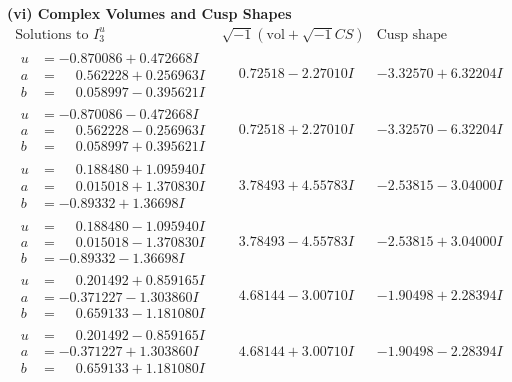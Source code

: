 \documentclass[1p]{elsarticle_modified}
\theoremstyle{definition}
\newcommand{\I}{\sqrt{-1}}
\begin{document}
\newpage\flushleft \textbf{(vi) Complex Volumes and Cusp Shapes}
$$\begin{array}{c|c|c}  
\text{Solutions to }I^u_{3}& \I (\text{vol} + \sqrt{-1}CS) & \text{Cusp shape}\\
 \hline 
\begin{aligned}
u &= -0.870086 + 0.472668 I \\
a &= \phantom{-}0.562228 + 0.256963 I \\
b &= \phantom{-}0.058997 - 0.395621 I\end{aligned}
 & \phantom{-}0.72518 - 2.27010 I & -3.32570 + 6.32204 I \\ \hline\begin{aligned}
u &= -0.870086 - 0.472668 I \\
a &= \phantom{-}0.562228 - 0.256963 I \\
b &= \phantom{-}0.058997 + 0.395621 I\end{aligned}
 & \phantom{-}0.72518 + 2.27010 I & -3.32570 - 6.32204 I \\ \hline\begin{aligned}
u &= \phantom{-}0.188480 + 1.095940 I \\
a &= \phantom{-}0.015018 + 1.370830 I \\
b &= -0.89332 + 1.36698 I\end{aligned}
 & \phantom{-}3.78493 + 4.55783 I & -2.53815 - 3.04000 I \\ \hline\begin{aligned}
u &= \phantom{-}0.188480 - 1.095940 I \\
a &= \phantom{-}0.015018 - 1.370830 I \\
b &= -0.89332 - 1.36698 I\end{aligned}
 & \phantom{-}3.78493 - 4.55783 I & -2.53815 + 3.04000 I \\ \hline\begin{aligned}
u &= \phantom{-}0.201492 + 0.859165 I \\
a &= -0.371227 - 1.303860 I \\
b &= \phantom{-}0.659133 - 1.181080 I\end{aligned}
 & \phantom{-}4.68144 - 3.00710 I & -1.90498 + 2.28394 I \\ \hline\begin{aligned}
u &= \phantom{-}0.201492 - 0.859165 I \\
a &= -0.371227 + 1.303860 I \\
b &= \phantom{-}0.659133 + 1.181080 I\end{aligned}
 & \phantom{-}4.68144 + 3.00710 I & -1.90498 - 2.28394 I \\ \hline\begin{aligned}

\end{aligned}
\end{array}$$
\end{document}
